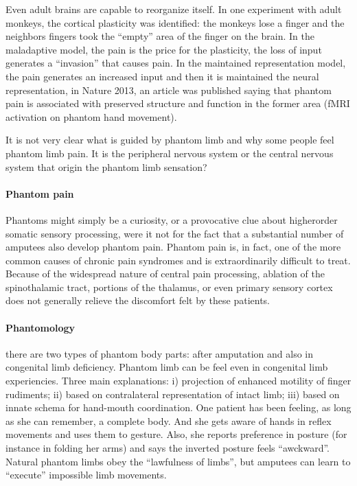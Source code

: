 \documentclass[12pt,article,oneside,a4paper]{memoir}
\begin{document}
Even adult brains are capable to reorganize itself. In one experiment with adult monkeys, the cortical plasticity was identified: the monkeys lose a finger and the neighbors fingers took the ``empty'' area of the finger on the brain.
In the maladaptive model, the pain is the price for the plasticity, the loss of input generates a ``invasion'' that causes pain. 
In the maintained representation model, the pain generates an increased input and then it is maintained the neural representation, in Nature 2013, an article was published saying that phantom pain is associated with preserved structure and function in the former area (fMRI activation on phantom hand movement).

It is not very clear what is guided by phantom limb and why some people feel phantom limb pain. It is the peripheral nervous system or the central nervous system that origin the phantom limb sensation?

\paragraph{Phantom pain}
Phantoms might simply be a curiosity, or a provocative clue about higherorder somatic sensory processing, were it not for the fact that a substantial number of amputees also develop phantom pain. Phantom pain is, in fact, one of the more common causes of chronic pain syndromes and is extraordinarily difficult to treat. Because of the widespread nature of central pain processing, ablation of the spinothalamic tract, portions of the thalamus, or even primary sensory cortex does not generally relieve the discomfort felt by these patients.

\paragraph{Phantomology} there are two types of phantom body parts: after amputation and also in congenital limb deficiency.
Phantom limb can be feel even in congenital limb experiencies. Three main explanations: i) projection of enhanced motility of finger rudiments; ii) based on contralateral representation of intact limb; iii) based on innate schema for hand-mouth coordination. 
One patient has been feeling, as long as she can remember, a complete body. And she gets aware of hands in reflex movements and uses them to gesture. Also, she reports preference in posture (for instance in folding her arms) and says the inverted posture feels ``awckward''. Natural phantom limbs obey the ``lawfulness of limbs'', but amputees can learn to ``execute'' impossible limb movements.
\end{document}
